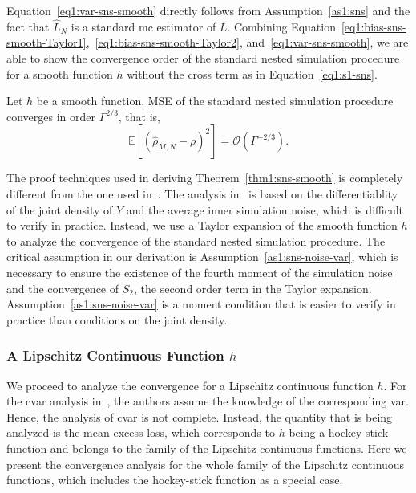 Equation~\eqref{eq1:var-sns-smooth} directly follows from Assumption~\ref{as1:sns} and the fact that $\hat{L}_N$ is a standard \gls{mc} estimator of $L$.
Combining Equation~\eqref{eq1:bias-sns-smooth-Taylor1},~\ref{eq1:bias-sns-smooth-Taylor2}, and~\ref{eq1:var-sns-smooth}, we are able to show the convergence order of the standard nested simulation procedure for a smooth function $h$ without the cross term as in Equation~\eqref{eq1:s1-sns}.

\begin{theorem}\label{thm1:sns-smooth}
    Let $h$ be a smooth function. 
    MSE of the standard nested simulation procedure converges in order $\Gamma^{2/3}$, that is,
    $$\mathbb{E} \left[ \left( \hat{\rho}_{M, N} - \rho \right)^2 \right] = \mathcal{O}(\Gamma^{-2/3}).$$
\end{theorem}

The proof techniques used in deriving Theorem~\ref{thm1:sns-smooth} is completely different from the one used in~\cite{gordy2010nested}.
The analysis in~\cite{gordy2010nested} is based on the differentiablity of the joint density of $Y$ and the average inner simulation noise, which is difficult to verify in practice.
Instead, we use a Taylor expansion of the smooth function $h$ to analyze the convergence of the standard nested simulation procedure.
The critical assumption in our derivation is Assumption~\ref{as1:sns-noise-var}, which is necessary to ensure the existence of the fourth moment of the simulation noise and the convergence of $S_2$, the second order term in the Taylor expansion.
Assumption~\ref{as1:sns-noise-var} is a moment condition that is easier to verify in practice than conditions on the joint density.

\subsubsection*{A Lipschitz Continuous Function $h$}
We proceed to analyze the convergence for a Lipschitz continuous function $h$.
For the \gls{cvar} analysis in~\cite{gordy2010nested}, the authors assume the knowledge of the corresponding \gls{var}.
Hence, the analysis of \gls{cvar} is not complete.
Instead, the quantity that is being analyzed is the mean excess loss, which corresponds to $h$ being a hockey-stick function and belongs to the family of the Lipschitz continuous functions. 
Here we present the convergence analysis for the whole family of the Lipschitz continuous functions, which includes the hockey-stick function as a special case. 

